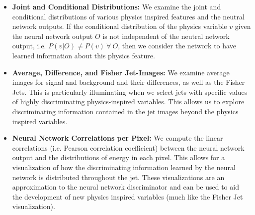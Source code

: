 \begin{itemize}
\item \textbf{Joint and Conditional Distributions:}  We examine the joint and conditional distributions of various physics inspired features and the neutral network outputs.  If the conditional distribution of the physics variable $v$ given the neural network output $O$ is not independent of the neutral network output, i.e. $P(v|O) \neq P(v)\ \forall\ O$, then we consider the network to have learned information about this physics feature.

\item \textbf{Average, Difference, and Fisher Jet-Images:}  We examine average images for signal and background and their differences, as well as the Fisher Jets.  This is particularly illuminating when we select jets with specific values of highly discriminating physics-inspired variables.  This allows us to explore discriminating information contained in the jet images beyond the physics inspired variables.

\item \textbf{Neural Network Correlations per Pixel:}  We compute the linear correlations (i.e. Pearson correlation coefficient) between the neural network output and the distributions of energy in each pixel.  This allows for a visualization of how the discriminating information learned by the neural network is distributed throughout the jet.  These visualizations are an approximation to the neural network discriminator and can be used to aid the development of new physics inspired variables (much like the Fisher Jet visualization).

\end{itemize}

